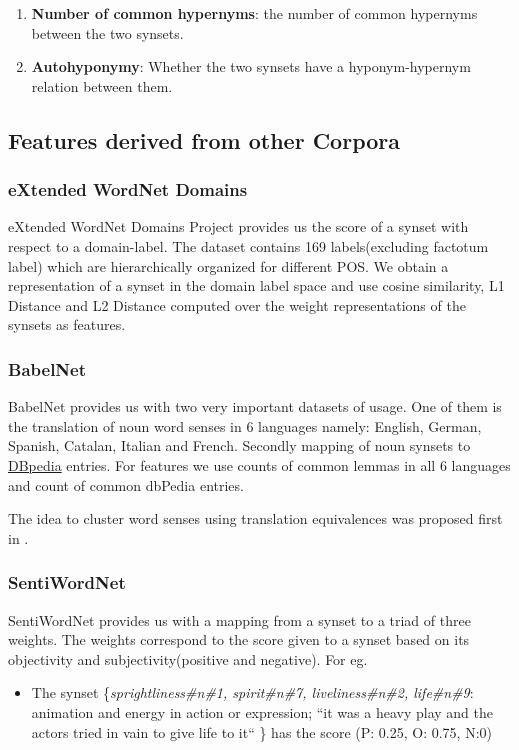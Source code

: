 \begin{enumerate}
\item \textbf{Number of common hypernyms}: the number of common hypernyms between the two synsets.

\item \textbf{Autohyponymy}: Whether the two synsets have a hyponym-hypernym relation between them.

\end{enumerate}

\subsection{Features derived from other Corpora}
\subsubsection{eXtended WordNet Domains} eXtended WordNet Domains Project \citep{Gonzalez:XWND} provides us the score of a synset with respect to a domain-label. The dataset contains 169 labels(excluding factotum label) which are hierarchically organized for different POS. We obtain a representation of a synset in the domain label space and use cosine similarity, L1 Distance and L2 Distance computed over the weight representations of the synsets as features.

\subsubsection{BabelNet} BabelNet \citep{NavigliPonzetto:12aij} provides us with two very important datasets of usage. 
One of them is the translation of noun word senses in 6 languages namely: English, German, Spanish, Catalan, Italian and French. Secondly mapping of noun synsets to  \href{http://dbpedia.org/About}{DBpedia} entries. 
For features we use counts of common lemmas in all 6 languages and count of common dbPedia entries.

The idea to cluster word senses using translation equivalences was proposed first in \citep{Resnik:1999:TranslationEquivalences}.

\subsubsection{SentiWordNet} SentiWordNet \citep{Baccianella10sentiwordnet3.0} provides us with a mapping from a synset to a triad of three weights. The weights correspond to the score given to a synset based on its objectivity and subjectivity(positive and negative). For eg.
\begin{itemize}
\item The synset \{\textit{sprightliness\#n\#1, spirit\#n\#7,  liveliness\#n\#2,  life\#n\#9}: animation and energy in action or expression; ``it was a heavy play and the actors tried in vain to give life to it`` \} has the score (P: 0.25, O: 0.75, N:0)
\end{itemize}


